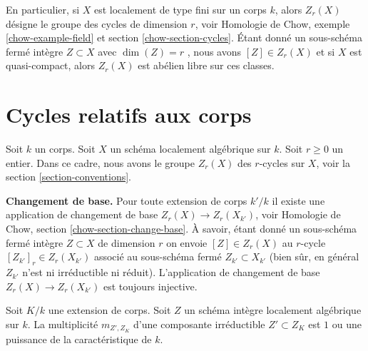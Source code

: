 \medskip\noindent
 En particulier, si  $X$  est localement de type fini sur un corps $k$, 
alors  $Z_r(X)$  désigne le groupe des cycles de dimension $r$, voir
 Homologie de Chow, exemple  \ref{chow-example-field}  et 
section \ref{chow-section-cycles}. Étant donné un sous-schéma fermé
 intègre  $Z \subset X$  avec $\dim(Z) = r$ , nous avons  $[Z] \in Z_r(X)$
  et si  $X$  est quasi-compact, alors $Z_r(X)$  est abélien libre sur ces classes. 




\section{Cycles relatifs aux corps} 
\label{section-relative-fields} 

\noindent
 Soit $k$ un corps. Soit  $X$  un schéma localement algébrique sur  $k$. 
Soit  $r \geq 0$  un entier. Dans ce cadre, nous avons le groupe 
$Z_r(X)$  des  $r$-cycles sur  $X$, voir la section  \ref{section-conventions}. 

\medskip\noindent
 {\bf  Changement de base. }  Pour toute extension de corps  $k'/k$  il existe une application de changement 
de base  $Z_r(X) \to Z_r(X_{k'})$, voir
 Homologie de Chow, section  \ref{chow-section-change-base}. À 
savoir, étant donné un sous-schéma fermé intègre  $Z \subset X$
  de dimension  $r$  on envoie  $[Z] \in Z_r(X)$  au $r$-cycle  
$[Z_{k'}]_r \in Z_r(X_{k'})$  associé au sous-schéma fermé  
$Z_{k'} \subset X_{k'}$  (bien sûr, en général  $Z_{k'}$
  n’est ni irréductible ni réduit). L’application de changement de base  
$Z_r(X) \to Z_r(X_{k'})$  est toujours injective. 

\begin{lemma} 
\label{lemma-multiplicities-field-extension} 
Soit $K/k$ une extension de corps. Soit $Z$ un schéma intègre localement 
algébrique sur $k$. La multiplicité  $m_{Z', Z_K}$  d’une composante 
irréductible  $Z' \subset Z_K$  est  $1$  ou une puissance de la caractéristique de  $k$. 
\end{lemma} 


